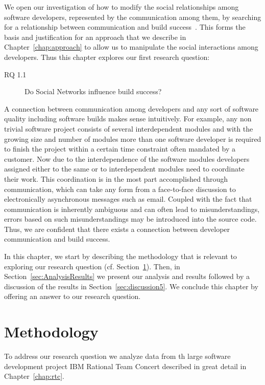 \label{chap:soc-net}
We open our investigation of how to modify the social relationships among software developers, represented by the communication among them, by searching for a relationship between communication and build success~\cite{wolf:icse:2009}.
This forms the basis and justification for an approach that we describe in Chapter~\ref{chap:approach} to allow us to manipulate the social interactions among developers.
Thus this chapter explores our first research question:
\begin{description}
\item[RQ 1.1] Do Social Networks influence build success?
\end{description}

A connection between communication among developers and any sort of software quality including software builds makes sense intuitively.
For example, any non trivial software project consists of several interdependent modules and with the growing size and number of modules more than one software developer is required to finish the project within a certain time constraint often mandated by a customer.
Now due to the interdependence of the software modules developers assigned either to the same or to interdependent modules need to coordinate their work.
This coordination is in the most part accomplished through communication, which can take any form from a face-to-face discussion to electronically asynchronous messages such as email.
Coupled with the fact that communication is inherently ambiguous and can often lead to misunderstandings, errors based on such misunderstandings may be introduced into the source code.
Thus, we are confident that there exists  a connection between developer communication and build success.

In this chapter, we start by describing the methodology that is relevant to exploring our research question (cf. Section~\ref{sec:Methodology}).
Then, in Section~\ref{sec:AnalysisResults} we present our analysis and results followed by a discussion of the results in Section~\ref{sec:discussion5}.
We conclude this chapter by offering an answer to our research question.


\section{Methodology}
\label{sec:Methodology}
To address our research question we analyze data from th large software
development project IBM Rational Team Concert described in great detail in Chapter~\ref{chap:rtc}.

